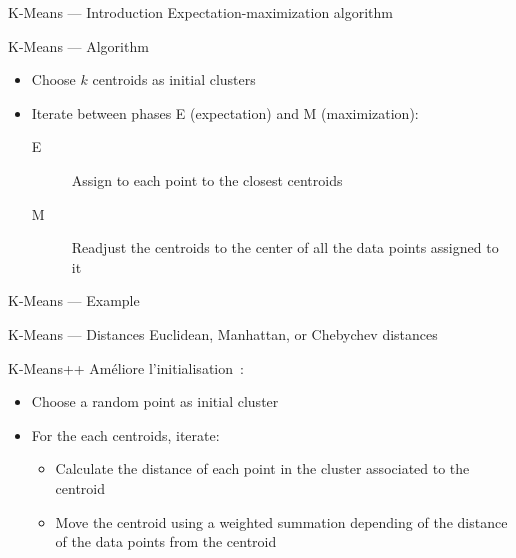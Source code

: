 \begin{frame}{K-Means --- Introduction}
  Expectation-maximization algorithm
\end{frame}

\begin{frame}{K-Means --- Algorithm}
  \begin{itemize}
    \item Choose $k$ centroids as initial clusters
    \item Iterate between phases E (expectation) and M (maximization):
      \begin{description}
        \item[E] Assign to each point to the closest centroids
        \item[M] Readjust the centroids to the center of all the data points assigned to it
      \end{description}
  \end{itemize}  
\end{frame}

\begin{frame}{K-Means --- Example}
\end{frame}

\begin{frame}{K-Means --- Distances}
  Euclidean, Manhattan, or Chebychev distances
\end{frame}

\begin{frame}{K-Means++}
  Améliore l'initialisation~:

  \begin{itemize}
    \item Choose a random point as initial cluster
    \item For the each centroids, iterate:
      \begin{itemize}
        \item Calculate the distance of each point in the cluster associated to the centroid
        \item Move the centroid using a weighted summation depending of the distance of the data points from the centroid
      \end{itemize}
  \end{itemize}

\end{frame}

